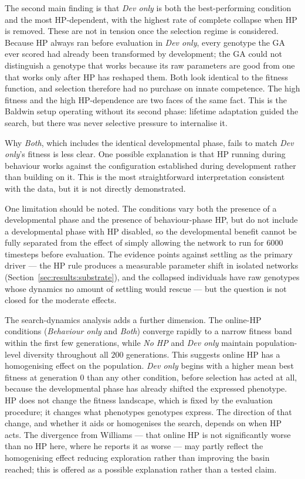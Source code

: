 The second main finding is that \emph{Dev only} is both the best-performing
condition and the most HP-dependent, with the highest rate of complete collapse
when HP is removed. These are not in tension once the selection regime is
considered. Because HP always ran before evaluation in \emph{Dev only}, every
genotype the GA ever scored had already been transformed by development; the GA
could not distinguish a genotype that works because its raw parameters are good
from one that works only after HP has reshaped them. Both look identical to the
fitness function, and selection therefore had no purchase on innate competence.
The high fitness and the high HP-dependence are two faces of the same fact. This
is the Baldwin setup operating without its second phase: lifetime adaptation
guided the search, but there was never selective pressure to internalise it.

Why \emph{Both}, which includes the identical developmental phase, fails to
match \emph{Dev only}'s fitness is less clear. One possible explanation is that
HP running during behaviour works against the configuration established during
development rather than building on it. This is the most straightforward
interpretation consistent with the data, but it is not directly demonstrated.

One limitation should be noted. The conditions vary both the presence of a
developmental phase and the presence of behaviour-phase HP, but do not include
a developmental phase with HP disabled, so the developmental benefit cannot be
fully separated from the effect of simply allowing the network to run for $6000$
timesteps before evaluation. The evidence points against settling as the primary
driver --- the HP rule produces a measurable parameter shift in isolated networks
(Section~\ref{sec:results:substrate}), and the collapsed individuals have raw
genotypes whose dynamics no amount of settling would rescue --- but the question
is not closed for the moderate effects.

The search-dynamics analysis adds a further dimension. The online-HP conditions
(\emph{Behaviour only} and \emph{Both}) converge rapidly to a narrow fitness
band within the first few generations, while \emph{No HP} and \emph{Dev only}
maintain population-level diversity throughout all $200$ generations. This
suggests online HP has a homogenising effect on the population. \emph{Dev only}
begins with a higher mean best fitness at generation $0$ than any other
condition, before selection has acted at all, because the developmental phase
has already shifted the expressed phenotype. HP does not change the fitness
landscape, which is fixed by the evaluation procedure; it changes what
phenotypes genotypes express. The direction of that change, and whether it aids
or homogenises the search, depends on when HP acts. The divergence from
Williams --- that online HP is not significantly worse than no HP here, where
he reports it as worse --- may partly reflect the homogenising effect reducing
exploration rather than improving the basin reached; this is offered as a
possible explanation rather than a tested claim.

